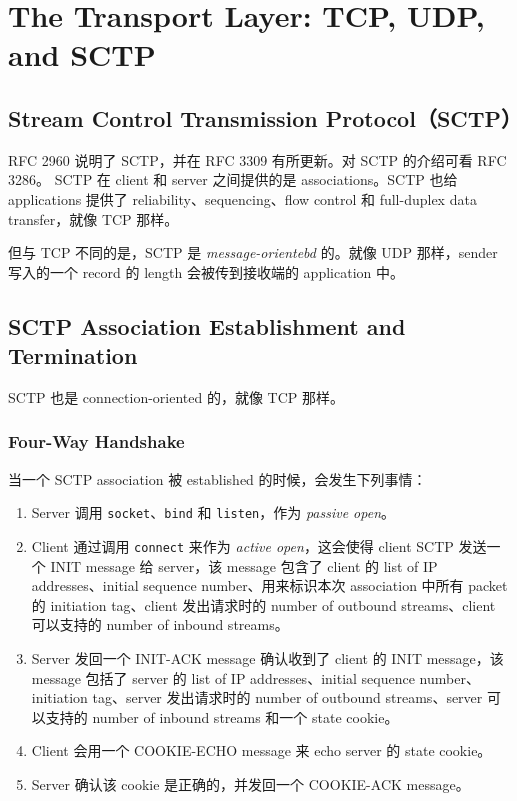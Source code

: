 \section{The Transport Layer: TCP, UDP, and SCTP}

  \subsection{Stream Control Transmission Protocol（SCTP）}

    RFC 2960 说明了 SCTP，并在 RFC 3309 有所更新。对 SCTP 的介绍可看 RFC 3286。
    SCTP 在 client 和 server 之间提供的是 associations。SCTP 也给 applications 提供了 reliability、sequencing、flow control 和 full-duplex data transfer，就像 TCP 那样。

    但与 TCP 不同的是，SCTP 是 \textit{message-orientebd} 的。就像 UDP 那样，sender 写入的一个 record 的 length 会被传到接收端的 application 中。

  \subsection{SCTP Association Establishment and Termination}

    SCTP 也是 connection-oriented 的，就像 TCP 那样。

    \subsubsection{Four-Way Handshake}

      当一个 SCTP association 被 established 的时候，会发生下列事情：

      \begin{enumerate}
        \item Server 调用 \texttt{socket}、\texttt{bind} 和 \texttt{listen}，作为 \textit{passive open}。
        \item Client 通过调用 \texttt{connect} 来作为 \textit{active open}，这会使得 client SCTP 发送一个 INIT message 给 server，该 message 包含了 client 的 list of IP addresses、initial sequence number、用来标识本次 association 中所有 packet 的 initiation tag、client 发出请求时的 number of outbound streams、client 可以支持的 number of inbound streams。
        \item Server 发回一个 INIT-ACK message 确认收到了 client 的 INIT message，该 message 包括了 server 的 list of IP addresses、initial sequence number、initiation tag、server 发出请求时的 number of outbound streams、server 可以支持的 number of inbound streams 和一个 state cookie。
        \item Client 会用一个 COOKIE-ECHO message 来 echo server 的 state cookie。
        \item Server 确认该 cookie 是正确的，并发回一个 COOKIE-ACK message。
      \end{enumerate}

